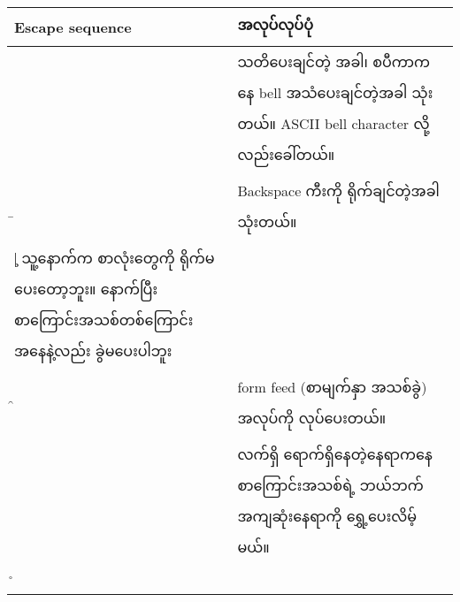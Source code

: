 \documentclass[11pt]{article}
\begin{document}
\begin{longtable}[c]{@{}ll@{}}
\toprule
\begin{minipage}[b]{0.21\columnwidth}\raggedright\strut
Escape sequence
\strut\end{minipage} &
\begin{minipage}[b]{0.73\columnwidth}\raggedright\strut
အလုပ်လုပ်ပုံ
\strut\end{minipage}\tabularnewline
\midrule
\endhead
\begin{minipage}[t]{0.21\columnwidth}\raggedright\strut
\a          
\strut\end{minipage} &
\begin{minipage}[t]{0.73\columnwidth}\raggedright\strut
သတိပေးချင်တဲ့ အခါ၊ စပီကာကနေ bell အသံပေးချင်တဲ့အခါ သုံးတယ်။ ASCII bell
character လို့လည်းခေါ်တယ်။
\strut\end{minipage}\tabularnewline
\begin{minipage}[t]{0.21\columnwidth}\raggedright\strut
\b 
\strut\end{minipage} &
\begin{minipage}[t]{0.73\columnwidth}\raggedright\strut
Backspace ကီးကို ရိုက်ချင်တဲ့အခါ သုံးတယ်။
\strut\end{minipage}\tabularnewline
\begin{minipage}[t]{0.21\columnwidth}\raggedright\strut
\c | သူ့နောက်က စာလုံးတွေကို ရိုက်မပေးတော့ဘူး။ နောက်ပြီး
စာကြောင်းအသစ်တစ်ကြောင်းအနေနဲ့လည်း ခွဲမပေးပါဘူး
\strut\end{minipage}\tabularnewline
\begin{minipage}[t]{0.21\columnwidth}\raggedright\strut
\f 
\strut\end{minipage} &
\begin{minipage}[t]{0.73\columnwidth}\raggedright\strut
form feed (စာမျက်နှာ အသစ်ခွဲ) အလုပ်ကို လုပ်ပေးတယ်။
\strut\end{minipage}\tabularnewline
\begin{minipage}[t]{0.21\columnwidth}\raggedright\strut
\n 
\strut\end{minipage} &
\begin{minipage}[t]{0.73\columnwidth}\raggedright\strut
လက်ရှိ ရောက်ရှိနေတဲ့နေရာကနေ စာကြောင်းအသစ်ရဲ့ ဘယ်ဘက် အကျဆုံးနေရာကို
ရွှေ့ပေးလိမ့်မယ်။
\strut\end{minipage}\tabularnewline
\begin{minipage}[t]{0.21\columnwidth}\raggedright\strut
\r 
\strut\end{minipage} &
\begin{minipage}[t]{0.73\columnwidth}\raggedright\strut

\end{minipage}
\end{longtable}
\end{document}
